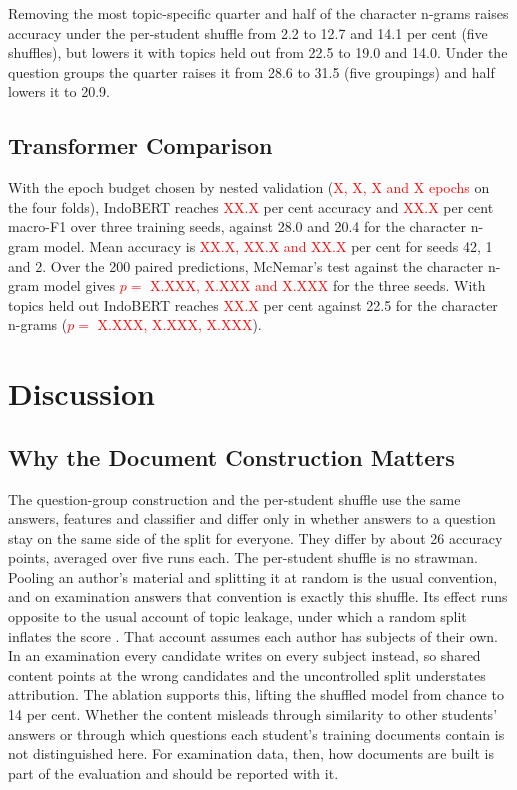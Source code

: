 \documentclass[conference]{IEEEtran}
\newcommand{\tbd}[1]{\textcolor{red}{#1}}
\begin{document}
Removing the most topic-specific quarter and half of the character n-grams raises accuracy under the per-student shuffle from 2.2 to 12.7 and 14.1 per cent (five shuffles), but lowers it with topics held out from 22.5 to 19.0 and 14.0. Under the question groups the quarter raises it from 28.6 to 31.5 (five groupings) and half lowers it to 20.9.

\subsection{Transformer Comparison}

With the epoch budget chosen by nested validation (\tbd{X, X, X and X epochs} on the four folds), IndoBERT reaches \tbd{XX.X} per cent accuracy and \tbd{XX.X} per cent macro-F1 over three training seeds, against 28.0 and 20.4 for the character n-gram model. Mean accuracy is \tbd{XX.X, XX.X and XX.X} per cent for seeds 42, 1 and 2. Over the 200 paired predictions, McNemar's test against the character n-gram model gives \tbd{$p = $ X.XXX, X.XXX and X.XXX} for the three seeds. With topics held out IndoBERT reaches \tbd{XX.X} per cent against 22.5 for the character n-grams (\tbd{$p = $ X.XXX, X.XXX, X.XXX}).

\section{Discussion}

\subsection{Why the Document Construction Matters}

The question-group construction and the per-student shuffle use the same answers, features and classifier and differ only in whether answers to a question stay on the same side of the split for everyone. They differ by about 26 accuracy points, averaged over five runs each. The per-student shuffle is no strawman. Pooling an author's material and splitting it at random is the usual convention, and on examination answers that convention is exactly this shuffle. Its effect runs opposite to the usual account of topic leakage, under which a random split inflates the score \cite{Wegmann2022,Altakrori2021}. That account assumes each author has subjects of their own. In an examination every candidate writes on every subject instead, so shared content points at the wrong candidates and the uncontrolled split understates attribution. The ablation supports this, lifting the shuffled model from chance to 14 per cent. Whether the content misleads through similarity to other students' answers or through which questions each student's training documents contain is not distinguished here. For examination data, then, how documents are built is part of the evaluation and should be reported with it.
\end{document}
